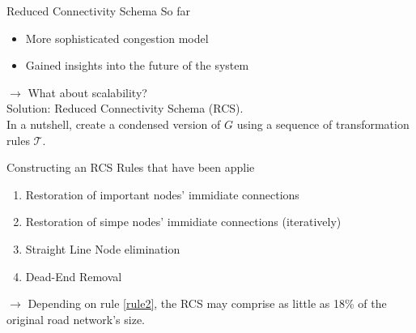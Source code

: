 \begin{frame}{Reduced Connectivity Schema}
	So far
	\begin{itemize}
		\item More sophisticated congestion model \checkmark
		\item Gained insights into the future of the system \checkmark
	\end{itemize}
	$\rightarrow$ What about scalability?\\
	\vspace{0.5cm}
	Solution: Reduced Connectivity Schema (RCS). \\
	\vspace{0.1cm}
	In a nutshell, create a condensed version of $G$  using a sequence of transformation rules $\mathcal{T}$.
\end{frame}
\begin{frame}{Constructing an RCS}
	Rules that have been applie
	\begin{enumerate}
		\item Restoration of important nodes' immidiate connections 
		\item Restoration of simpe nodes' immidiate connections (iteratively)\label{rule2}
		\item Straight Line Node elimination
		\item Dead-End Removal
	\end{enumerate}
	\vspace{0.2cm}
	$\rightarrow$ Depending on rule \ref{rule2}, the RCS may comprise as little as 18\% of the original road network's size.
	
\end{frame}








